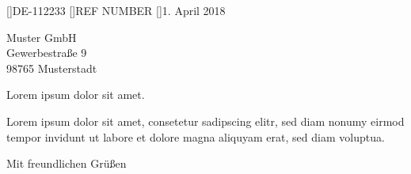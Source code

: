 \documentclass[version=last,paper=A4,foldmarks=true,fontsize=12pt,parskip=full,fromalign=right,
	fromphone=true,
	fromfax=false,
	fromemail=true,
	fromurl=false,
]{scrlttr2}
\begin{document}

[\customername]{DE-112233}
[\yourrefname]{REF NUMBER}
[\yourmailname]{1. April 2018}

\begin{letter}{
    Muster GmbH\\
    Gewerbestraße 9\\
    98765 Musterstadt
}


\opening{Lorem ipsum dolor sit amet.}

Lorem ipsum dolor sit amet, consetetur sadipscing elitr, sed diam nonumy eirmod tempor invidunt ut labore et dolore magna aliquyam erat, sed diam voluptua.

\closing{Mit freundlichen Grüßen}



\end{letter}
\end{document}
